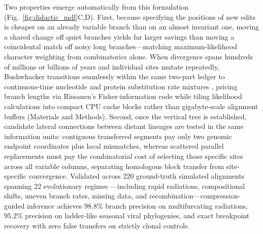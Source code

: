\documentclass[11pt,a4paper]{article}
\begin{document}
Two properties emerge automatically from this formulation (Fig.~\ref{fig:didactic_mdl}C,D). First, because specifying the positions of new edits is cheaper on an already variable branch than on an almost invariant one, moving a shared change off quiet branches yields far larger savings than moving a coincidental match off noisy long branches---matching maximum-likelihood character weighting \citep{felsenstein1981evolutionary} from combinatorics alone. When divergence spans hundreds of millions or billions of years and individual sites mutate repeatedly, Bushwhacker transitions seamlessly within the same two-part ledger to continuous-time nucleotide and protein substitution rate mixtures \citep{tavare1986some,yang1994maximum,le2008improved}, pricing branch lengths via Rissanen's Fisher-information code \citep{rissanen1983universal} while tiling likelihood calculations into compact CPU cache blocks rather than gigabyte-scale alignment buffers (Materials and Methods). Second, once the vertical tree is established, candidate lateral connections between distant lineages are tested in the same information units: contiguous transferred segments pay only two genomic endpoint coordinates plus local mismatches, whereas scattered parallel replacements must pay the combinatorial cost of selecting those specific sites across all variable columns, separating homologous block transfer from site-specific convergence. Validated across 220 ground-truth simulated alignments spanning 22 evolutionary regimes \citep{lytrong2022alisim}---including rapid radiations, compositional shifts, uneven branch rates, missing data, and recombination---compression-guided inference achieves $98.8\%$ branch precision on multifurcating radiations, $95.2\%$ precision on ladder-like seasonal viral phylogenies, and exact breakpoint recovery with zero false transfers on strictly clonal controls.
\end{document}
